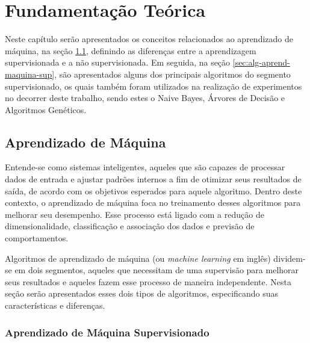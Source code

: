 \documentclass[oneside,openright,12pt]{ufsm_2015} %
\begin{document}

\chapter{Fundamentação Teórica}
\label{sec:fund-teorica}

\par Neste capítulo serão apresentados os conceitos relacionados ao aprendizado de máquina, na seção \ref{sec:aprend-maquina}, definindo as diferenças entre a aprendizagem supervisionada e a não supervisionada. Em seguida, na seção \ref{sec:alg-aprend-maquina-sup}, são apresentados alguns dos principais algoritmos do segmento supervisionado, os quais também foram utilizados na realização de experimentos no decorrer deste trabalho, sendo estes o Naive Bayes, Árvores de Decisão e Algoritmos Genéticos.


\section{Aprendizado de Máquina}
\label{sec:aprend-maquina}

\par Entende-se como sistemas inteligentes, aqueles que são capazes de processar dados de entrada e ajustar padrões internos a fim de otimizar seus resultados de saída, de acordo com os objetivos esperados para aquele algoritmo. Dentro deste contexto, o aprendizado de máquina foca no treinamento desses algoritmos para melhorar seu desempenho. Esse processo está ligado com a redução de dimensionalidade, classificação e associação dos dados e previsão de comportamentos.

\par Algoritmos de aprendizado de máquina (ou \textit{machine learning} em inglês) dividem-se em dois segmentos, aqueles que necessitam de uma supervisão para melhorar seus resultados e aqueles fazem esse processo de maneira independente. Nesta seção serão apresentados esses dois tipos de algoritmos, especificando suas características e diferenças.


\subsection{Aprendizado de Máquina Supervisionado}
\label{sec:aprend-maquina-sup}
\end{document}
